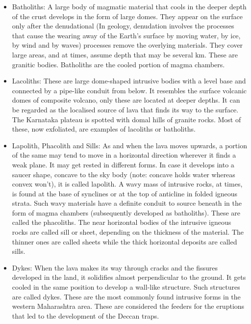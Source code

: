 \documentclass[8pt, a4paper, oneside, twocolumn]{extarticle}
\begin{document}
\begin{itemize}
  \item Batholiths: A large body of magmatic material that cools in the deeper depth of the crust develops in the form of large domes. They appear on the surface only after the denudational (In geology, denudation involves the processes that cause the wearing away of the Earth's surface by moving water, by ice, by wind and by waves) processes remove the overlying materials. They cover large areas, and at times, assume depth that may be several km. These are granitic bodies. Batholiths are the cooled portion of magma chambers. 
  \item Lacoliths: These are large dome-shaped intrusive bodies with a level base and connected by a pipe-like conduit from below. It resembles the surface volcanic domes of composite volcano, only these are located at deeper depths. It can be regarded as the localised source of lava that finds its way to the surface. The Karnataka plateau is spotted with domal hills of granite rocks. Most of these, now exfoliated, are examples of lacoliths or batholiths.
  \item Lapolith, Phacolith and Sills: As and when the lava moves upwards, a portion of the same may tend to move in a horizontal direction wherever it finds a weak plane. It may get rested in different forms. In case it develops into a saucer shape, concave to the sky body (note: concave holds water whereas convex won't), it is called lapolith. A wavy mass of intrusive rocks, at times, is found at the base of synclines or at the top of anticline in folded igneous strata. Such wavy materials have a definite conduit to source beneath in the form of magma chambers (subsequently developed as batholiths). These are called the phacoliths. The near horizontal bodies of the intrusive igneous rocks are called sill or sheet, depending on the thickness of the material. The thinner ones are called sheets while the thick horizontal deposits are called sills.
  \item Dykes: When the lava makes its way through cracks and the fissures developed in the land, it solidifies almost perpendicular to the ground. It gets cooled in the same position to develop a wall-like structure. Such structures are called dykes. These are the most commonly found intrusive forms in the western Maharashtra area. These are considered the feeders for the eruptions that led to the development of the Deccan traps.
  
\end{itemize}
\end{document}

